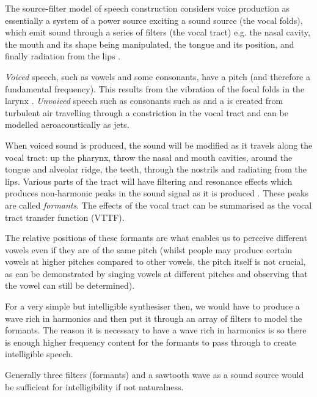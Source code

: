 

The source-filter model of speech construction considers voice production as essentially a system of a power source exciting a sound source (the vocal folds), which emit sound through a series of filters (the vocal tract) e.g. the nasal cavity, the mouth and its shape being manipulated, the tongue and its position, and finally radiation from the lips \cite{Howard2008}. 

\textit{Voiced} speech, such as vowels and some consonants, have a pitch (and therefore a fundamental frequency). This results from the vibration of the focal folds in the larynx \cite{Howard2008}. \textit{Unvoiced} speech such as consonants such as  and a  is created from turbulent air travelling through a constriction in the vocal tract \cite{Howard2008,Narayanan2000,Johnson2003} and can be modelled aeroacoustically as jets.

When voiced sound is produced, the sound will be modified as it travels along the vocal tract: up the pharynx, throw the nasal and mouth cavities, around the tongue and alveolar ridge, the teeth, through the nostrils and radiating from the lips. Various parts of the tract will have filtering and resonance effects which produces non-harmonic peaks in the sound signal as it is produced \cite{Johnson2003}. These peaks are called \textit{formants}. The effects of the vocal tract can be summarised as the vocal tract transfer function (VTTF).

The relative positions of these formants are what enables us to perceive different vowels even if they are of the same pitch (whilst people may produce certain vowels at higher pitches compared to other vowels, the pitch itself is not crucial, as can be demonstrated by singing vowels at different pitches and observing that the vowel can still be determined).

For a very simple but intelligible synthesiser then, we would have to produce a wave rich in harmonics and then put it through an array of filters to model the formants. The reason it is necessary to have a wave rich in harmonics is so there is enough higher frequency content for the formants to pass through to create intelligible speech.

Generally three filters (formants) and a sawtooth wave as a sound source would be sufficient for intelligibility if not naturalness.

